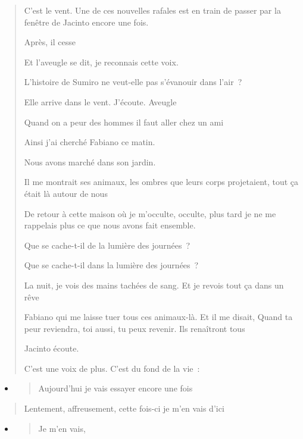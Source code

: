 \begin{quote}
C'est le vent. Une de ces nouvelles rafales est en train de passer par
la fenêtre de Jacinto encore une fois.

Après, il cesse

Et l'aveugle se dit, je reconnais cette voix.

L'histoire de Sumiro ne veut-elle pas s'évanouir dans l'air~?

Elle arrive dans le vent. J'écoute. Aveugle

Quand on a peur des hommes il faut aller chez un ami

Ainsi j'ai cherché Fabiano ce matin.

Nous avons marché dans son jardin.

Il me montrait ses animaux, les ombres que leurs corps projetaient, tout
ça était là autour de nous

De retour à cette maison où je m'occulte, occulte, plus tard je ne me
rappelais plus ce que nous avons fait ensemble.

Que se cache-t-il de la lumière des journées~?

Que se cache-t-il dans la lumière des journées~?

La nuit, je vois des mains tachées de sang. Et je revois tout ça dans un
rêve

Fabiano qui me laisse tuer tous ces animaux-là. Et il me disait, Quand
ta peur reviendra, toi aussi, tu peux revenir. Ils renaîtront tous

Jacinto écoute.

C'est une voix de plus. C'est du fond de la vie~:
\end{quote}

\begin{itemize}
\item
  \begin{quote}
  Aujourd'hui je vais essayer encore une fois
  \end{quote}
\end{itemize}

\begin{quote}
Lentement, affreusement, cette fois-ci je m'en vais d'ici
\end{quote}

\begin{itemize}
\item
  \begin{quote}
  Je m'en vais,
  \end{quote}
\end{itemize}

